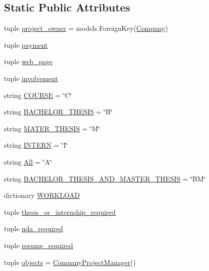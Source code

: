 \subsection*{Static Public Attributes}
\begin{DoxyCompactItemize}
\item 
tuple \hyperlink{classcompanies_1_1models_1_1_company_project_afa051ee34a614cafc6e58adbad733eea}{project\-\_\-owner} = models.\-Foreign\-Key(\hyperlink{classcompanies_1_1models_1_1_company}{Company})
\item 
tuple \hyperlink{classcompanies_1_1models_1_1_company_project_ac0132379d4efdc016a9aa0ecf31bc0d3}{payment}
\item 
tuple \hyperlink{classcompanies_1_1models_1_1_company_project_a586c880356becb5915074982a3fb6ccc}{web\-\_\-page}
\item 
tuple \hyperlink{classcompanies_1_1models_1_1_company_project_a0f2cedd0374d9c24196c2f8e84b301ae}{involvement}
\item 
string \hyperlink{classcompanies_1_1models_1_1_company_project_a68e1ee8207b4fc464163e11c62c68825}{C\-O\-U\-R\-S\-E} = \char`\"{}C\char`\"{}
\item 
string \hyperlink{classcompanies_1_1models_1_1_company_project_a76b6f1517299d5a23c880913b00c713f}{B\-A\-C\-H\-E\-L\-O\-R\-\_\-\-T\-H\-E\-S\-I\-S} = \char`\"{}B\char`\"{}
\item 
string \hyperlink{classcompanies_1_1models_1_1_company_project_a9bc478aef83dd23eaeb3a18b4f498b80}{M\-A\-T\-E\-R\-\_\-\-T\-H\-E\-S\-I\-S} = \char`\"{}M\char`\"{}
\item 
string \hyperlink{classcompanies_1_1models_1_1_company_project_ab2826331a32127b5a204088178364ba5}{I\-N\-T\-E\-R\-N} = \char`\"{}I\char`\"{}
\item 
string \hyperlink{classcompanies_1_1models_1_1_company_project_a98a10cbba77cc9b523061b1ec674d636}{All} = \char`\"{}A\char`\"{}
\item 
string \hyperlink{classcompanies_1_1models_1_1_company_project_adf0247df80a0943f8cb566db92487411}{B\-A\-C\-H\-E\-L\-O\-R\-\_\-\-T\-H\-E\-S\-I\-S\-\_\-\-A\-N\-D\-\_\-\-M\-A\-S\-T\-E\-R\-\_\-\-T\-H\-E\-S\-I\-S} = \char`\"{}B\-M\char`\"{}
\item 
dictionary \hyperlink{classcompanies_1_1models_1_1_company_project_a12c29622767ae59fca574ba75309d191}{W\-O\-R\-K\-L\-O\-A\-D}
\item 
tuple \hyperlink{classcompanies_1_1models_1_1_company_project_ad59b58624bacc419f02c2be4880bd15e}{thesis\-\_\-or\-\_\-internship\-\_\-required}
\item 
tuple \hyperlink{classcompanies_1_1models_1_1_company_project_a07ee030ab328397c70017dd999d03fa6}{nda\-\_\-required}
\item 
tuple \hyperlink{classcompanies_1_1models_1_1_company_project_a510cc1d306089f11bd471729bd5fcdb6}{resume\-\_\-required}
\item 
tuple \hyperlink{classcompanies_1_1models_1_1_company_project_a4eb2ba8278f09da3f6fbb940448dcf99}{objects} = \hyperlink{classcompanies_1_1models_1_1_company_project_manager}{Company\-Project\-Manager}()
\end{DoxyCompactItemize}
